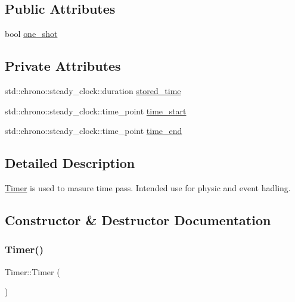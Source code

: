 \subsection*{Public Attributes}
\begin{DoxyCompactItemize}
\item 
bool \mbox{\hyperlink{classsc_1_1_timer_a2c23836479c69ea219f506a7ad8e83f5}{one\+\_\+shot}}
\end{DoxyCompactItemize}
\subsection*{Private Attributes}
\begin{DoxyCompactItemize}
\item 
std\+::chrono\+::steady\+\_\+clock\+::duration \mbox{\hyperlink{classsc_1_1_timer_a78d41ad3dda6d9d5dea782407fc85648}{stored\+\_\+time}}
\item 
std\+::chrono\+::steady\+\_\+clock\+::time\+\_\+point \mbox{\hyperlink{classsc_1_1_timer_aa363104760a70b9e4535c9aeda427fb8}{time\+\_\+start}}
\item 
std\+::chrono\+::steady\+\_\+clock\+::time\+\_\+point \mbox{\hyperlink{classsc_1_1_timer_afeb4a40cc0ed2afbe4a0e2e0bf2f67cb}{time\+\_\+end}}
\end{DoxyCompactItemize}


\subsection{Detailed Description}
\mbox{\hyperlink{classsc_1_1_timer}{Timer}} is used to masure time pass. Intended use for physic and event hadling. 

\subsection{Constructor \& Destructor Documentation}
\mbox{\label{classsc_1_1_timer_a5f16e8da27d2a5a5242dead46de05d97}} 
\subsubsection{\texorpdfstring{Timer()}{Timer()}}
{\footnotesize\ttfamily Timer\+::\+Timer (\begin{DoxyParamCaption}{ }\end{DoxyParamCaption})}

\mbox{\label{classsc_1_1_timer_a14fa469c4c295c5fa6e66a4ad1092146}} 
